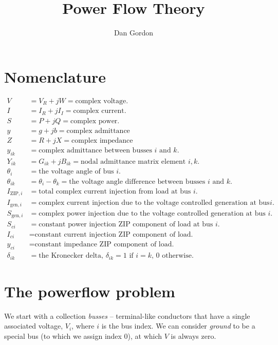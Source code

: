 \documentclass[11pt]{article}
\title{Power Flow Theory}
\author{Dan Gordon}
\date{}
\newcommand{\Vr}{{V_R}}
\newcommand{\Ir}{{I_R}}
\newcommand{\Ii}{{I_I}}
\begin{document}
\maketitle

\section{Nomenclature}
\begin{align*}
V &= \Vr + jW = \text{complex voltage.} \\
I &= \Ir + j\Ii = \text{complex current.} \\
S &= P + jQ = \text{complex power.} \\
y &= g + jb = \text{complex admittance} \\
Z &= R + jX = \text{complex impedance} \\
y_{ik} &= \text{complex admittance between busses $i$ and $k$.} \\
Y_{ik} &= G_{ik} + jB_{ik} = \text{nodal admittance matrix element $i, k$.} \\
\theta_{i} &= \text{the voltage angle of bus $i$.} \\
\theta_{ik} &= \theta_i - \theta_k = \text{the voltage angle difference between busses $i$ and $k$.} \\
I_{\text{ZIP},i} &= \text{total complex current injection from load at bus $i$.} \\
I_{\text{gen},i} &= \text{complex current injection due to the voltage controlled generation at bus $i$.} \\
S_{\text{gen},i} &= \text{complex power injection due to the voltage controlled generation at bus $i$.} \\
S_{ci} &= \text{constant power injection ZIP component of load at bus $i$.} \\
I_{ci} &= \text{constant current injection ZIP component of load.} \\
y_{ci} &= \text{constant impedance ZIP component of load.} \\
\delta_{ik} &= \text{the Kronecker delta, $\delta_{ik} = 1$ if $i = k$, 0 otherwise.}
\end{align*}

\section{The powerflow problem}
We start with a collection \emph{busses} -- terminal-like conductors that have a single associated voltage, $V_i$, where $i$ is the bus index. We can consider \emph{ground} to be a special bus (to which we assign index 0), at which $V$ is always zero.
\end{document}
